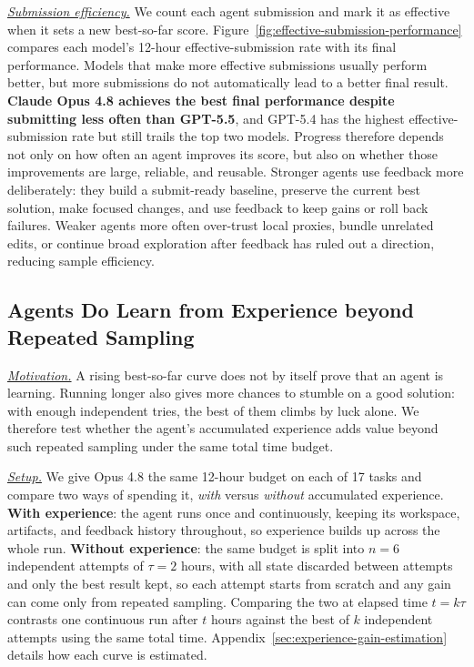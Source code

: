 \underline{\textit{Submission efficiency.}} We count each agent submission and mark it as effective when it sets a new best-so-far score. Figure~\ref{fig:effective-submission-performance} compares each model's 12-hour effective-submission rate with its final performance. Models that make more effective submissions usually perform better, but more submissions do not automatically lead to a better final result. \textbf{Claude Opus 4.8 achieves the best final performance despite submitting less often than GPT-5.5}, and GPT-5.4 has the highest effective-submission rate but still trails the top two models. Progress therefore depends not only on how often an agent improves its score, but also on whether those improvements are large, reliable, and reusable. Stronger agents use feedback more deliberately: they build a submit-ready baseline, preserve the current best solution, make focused changes, and use feedback to keep gains or roll back failures. Weaker agents more often over-trust local proxies, bundle unrelated edits, or continue broad exploration after feedback has ruled out a direction, reducing sample efficiency.

\subsection{Agents Do Learn from Experience beyond Repeated Sampling}
\label{sec:stateful-stateless-analysis}

\underline{\textit{Motivation.}} A rising best-so-far curve does not by itself prove that an agent is learning. Running longer also gives more chances to stumble on a good solution: with enough independent tries, the best of them climbs by luck alone. We therefore test whether the agent's accumulated experience adds value beyond such repeated sampling under the same total time budget.

\underline{\textit{Setup.}} We give Opus 4.8 the same 12-hour budget on each of 17 tasks and compare two ways of spending it, \textit{with} versus \textit{without} accumulated experience. \textbf{With experience}: the agent runs once and continuously, keeping its workspace, artifacts, and feedback history throughout, so experience builds up across the whole run. \textbf{Without experience}: the same budget is split into \(n=6\) independent attempts of \(\tau=2\) hours, with all state discarded between attempts and only the best result kept, so each attempt starts from scratch and any gain can come only from repeated sampling. Comparing the two at elapsed time \(t=k\tau\) contrasts one continuous run after \(t\) hours against the best of \(k\) independent attempts using the same total time. Appendix~\ref{sec:experience-gain-estimation} details how each curve is estimated.

